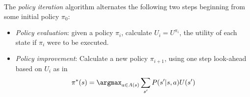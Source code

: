 \documentclass{article}
\begin{document}
\begin{theorem}
    The \emph{policy iteration} algorithm alternates the following two steps beginning
    from some initial policy $\pi_0$:
    \begin{itemize}
        \item \emph{Policy evaluation}: given a policy $\pi_i$, calculate $U_i=U^{\pi_i}$,
        the utility of each state if $\pi_i$ were to be executed.
        \item \emph{Policy improvement}: Calculate a new policy $\pi_{i+1}$, using one step
        look-ahead based on $U_i$ as in
        \begin{align*}
            \pi^*(s) = \argmax_{a\in A(s)}\sum_{s'} P(s'|s,a)U(s')
        \end{align*}
    \end{itemize}
\end{theorem}
\end{document}
